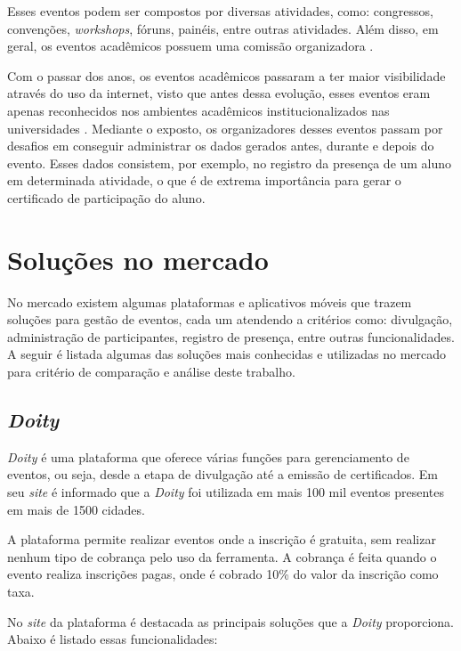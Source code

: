 Esses eventos podem ser compostos por diversas atividades, como: congressos, convenções, \textit{workshops}, fóruns, painéis, entre outras atividades. Além disso, em geral, os eventos acadêmicos possuem uma comissão organizadora \cite{araujo}.

Com o passar dos anos, os eventos acadêmicos passaram a ter maior visibilidade através do uso da internet, visto que antes dessa evolução, esses eventos eram apenas reconhecidos nos ambientes acadêmicos institucionalizados nas universidades \cite{araujo}. Mediante o exposto, os organizadores desses eventos passam por desafios em conseguir administrar os dados gerados antes, durante e depois do evento. Esses dados consistem, por exemplo, no registro da presença de um aluno em determinada atividade, o que é de extrema importância para gerar o certificado de participação do aluno.

\section{Soluções no mercado} \label{sec:mercado}

No mercado existem algumas plataformas e aplicativos móveis que trazem soluções para gestão de eventos, cada um atendendo a critérios como: divulgação, administração de participantes, registro de presença, entre outras funcionalidades. A seguir é listada algumas das soluções mais conhecidas e utilizadas no mercado para critério de comparação e análise deste trabalho.

\subsection{\textit{Doity}}

\textit{Doity} é uma plataforma que oferece várias funções para gerenciamento de eventos, ou seja, desde a etapa de divulgação até a emissão de certificados. Em seu \textit{site} é informado que a \textit{Doity} foi utilizada em mais 100 mil eventos presentes em mais de 1500 cidades. 

A plataforma permite realizar eventos onde a inscrição é gratuita, sem realizar nenhum tipo de cobrança pelo uso da ferramenta. A cobrança é feita quando o evento realiza inscrições pagas, onde é cobrado 10\% do valor da inscrição como taxa.

No \textit{site} da plataforma é destacada as principais soluções que a \textit{Doity} proporciona. Abaixo é listado essas funcionalidades:

